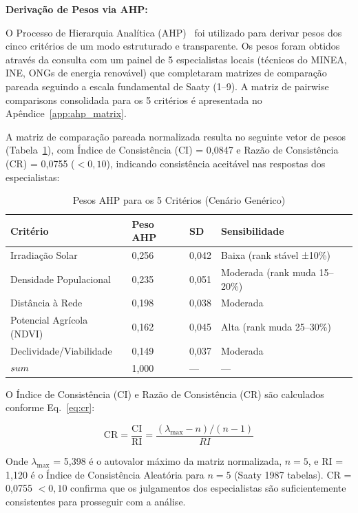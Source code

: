 \documentclass[12pt, a4paper]{article}
\begin{document}
\noindent\textbf{Derivação de Pesos via AHP:}

O Processo de Hierarquia Analítica (AHP)~\citep{Saaty1987} foi utilizado para derivar pesos dos cinco critérios de um modo estruturado e transparente. Os pesos foram obtidos através da consulta com um painel de 5 especialistas locais (técnicos do MINEA, INE, ONGs de energia renovável) que completaram matrizes de comparação pareada seguindo a escala fundamental de Saaty (1–9). A matriz de pairwise comparisons consolidada para os 5 critérios é apresentada no Apêndice~\ref{app:ahp_matrix}.

A matriz de comparação pareada normalizada resulta no seguinte vetor de pesos (Tabela~\ref{tab:ahp_weights}), com Índice de Consistência (CI) = 0,0847 e Razão de Consistência (CR) = 0,0755 ($< 0,10$), indicando consistência aceitável nas respostas dos especialistas:

\begin{table}[H]
\centering
\caption{Pesos AHP para os 5 Critérios (Cenário Genérico)}
\label{tab:ahp_weights}
\begin{tabular}{|l|l|l|l|}
\hline
\textbf{Critério} & \textbf{Peso AHP} & \textbf{SD} & \textbf{Sensibilidade} \\
\hline
Irradiação Solar & 0,256 & 0,042 & Baixa (rank stável ±10\%) \\
Densidade Populacional & 0,235 & 0,051 & Moderada (rank muda 15–20\%) \\
Distância à Rede & 0,198 & 0,038 & Moderada \\
Potencial Agrícola (NDVI) & 0,162 & 0,045 & Alta (rank muda 25–30\%) \\
Declividade/Viabilidade & 0,149 & 0,037 & Moderada \\
\hline
$\\sum$ & 1,000 & --- & --- \\
\hline
\end{tabular}
\end{table}

\noindent O Índice de Consistência (CI) e Razão de Consistência (CR) são calculados conforme Eq.~\ref{eq:cr}:

\begin{equation}
\label{eq:cr}
\text{CR} = \frac{\text{CI}}{\text{RI}} = \frac{(\lambda_{\max} - n)/(n-1)}{RI}
\end{equation}

Onde $\lambda_{\max}$ = 5,398 é o autovalor máximo da matriz normalizada, $n = 5$, e RI = 1,120 é o Índice de Consistência Aleatória para $n=5$ (Saaty 1987 tabelas). CR = 0,0755 $< 0,10$ confirma que os julgamentos dos especialistas são suficientemente consistentes para prosseguir com a análise.
\end{document}
